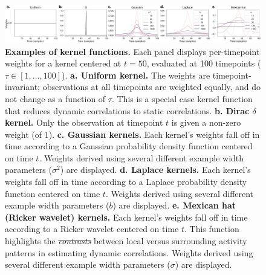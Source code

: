 \documentclass[english]{article}
\providecommand{\DIFaddtex}[1]{{\protect\color{blue}\uwave{#1}}} %
\providecommand{\DIFdeltex}[1]{{\protect\color{red}\sout{#1}}}                      %
\providecommand{\DIFaddFL}[1]{\DIFadd{#1}} %
\providecommand{\DIFdelFL}[1]{\DIFdel{#1}} %
\providecommand{\DIFaddbeginFL}{} %
\providecommand{\DIFaddendFL}{} %
\providecommand{\DIFdelbeginFL}{} %
\providecommand{\DIFdelendFL}{} %
\providecommand{\DIFadd}[1]{\texorpdfstring{\DIFaddtex{#1}}{#1}} %
\providecommand{\DIFdel}[1]{\texorpdfstring{\DIFdeltex{#1}}{}} %
\newcommand{\DIFscaledelfig}{0.5}
\newlength{\DIFdelgraphicswidth} %
\newlength{\DIFdelgraphicsheight} %
\newcommand{\DIFaddincludegraphics}[2][]{{\color{blue}\fbox{\DIFOincludegraphics[#1]{#2}}}} %
\newcommand{\DIFdelincludegraphics}[2][]{%
\sbox{\DIFdelgraphicsbox}{\DIFOincludegraphics[#1]{#2}}%
\settoboxwidth{\DIFdelgraphicswidth}{\DIFdelgraphicsbox} %
\settoboxtotalheight{\DIFdelgraphicsheight}{\DIFdelgraphicsbox} %
\scalebox{\DIFscaledelfig}{%
\parbox[b]{\DIFdelgraphicswidth}{\usebox{\DIFdelgraphicsbox}\\[-\baselineskip] \rule{\DIFdelgraphicswidth}{0em}}\llap{\resizebox{\DIFdelgraphicswidth}{\DIFdelgraphicsheight}{%
\setlength{\unitlength}{\DIFdelgraphicswidth}%
\begin{picture}(1,1)%
\thicklines\linethickness{2pt} %
{\color[rgb]{1,0,0}\put(0,0){\framebox(1,1){}}}%
{\color[rgb]{1,0,0}\put(0,0){\line( 1,1){1}}}%
{\color[rgb]{1,0,0}\put(0,1){\line(1,-1){1}}}%
\end{picture}%
}\hspace*{3pt}}} %
} %
\DeclareRobustCommand{\DIFaddbeginFL}{\DIFOaddbeginFL \let\includegraphics\DIFaddincludegraphics} %
\DeclareRobustCommand{\DIFaddendFL}{\DIFOaddendFL \let\includegraphics\DIFOincludegraphics} %
\DeclareRobustCommand{\DIFdelbeginFL}{\DIFOdelbeginFL \let\includegraphics\DIFdelincludegraphics} %
\DeclareRobustCommand{\DIFdelendFL}{\DIFOaddendFL \let\includegraphics\DIFOincludegraphics} %
\begin{document}
\begin{figure}
  \centering
  \includegraphics[width=\textwidth]{figs/kernels}
  \caption{\textbf{Examples of kernel functions.} Each panel displays
    per-timepoint weights for a kernel centered at $t = 50$, evaluated
    at 100 timepoints ($\tau \in \left[1, ..., 100\right]$).
   \textbf{a. Uniform kernel.} The weights are timepoint-invariant;
    observations at all timepoints are weighted equally, and do not
    change as a function of $\tau$.  This is a special case kernel
    function that reduces dynamic correlations to static correlations.
   \textbf{b. Dirac $\delta$ kernel.} Only the observation at
    timepoint $t$ is given a non-zero weight (of 1).
   \textbf{c. Gaussian kernels.} Each kernel's weights fall off in
    time according to a Gaussian probability density function centered
    on time $t$.  Weights derived using several different example
    width parameters ($\sigma^2$) are displayed.  \textbf{d. Laplace
       kernels.}  Each kernel's weights fall off in time according to a
    Laplace probability density function centered on time $t$.
    Weights derived using several different example width parameters
    ($b$) are displayed.  \textbf{e. Mexican hat (Ricker wavelet)
       kernels.}  Each kernel's weights fall off in time according to a
    Ricker wavelet centered on time $t$.  This function highlights the
    \DIFdelbeginFL \textit{\DIFdelFL{contrasts}} %
\DIFdelendFL \DIFaddbeginFL \DIFaddFL{contrasts }\DIFaddendFL between local versus surrounding activity
    patterns in estimating dynamic correlations. Weights derived using
    several different example width parameters ($\sigma$) are
    displayed.}
  \label{fig:kernels}

\end{figure}
\end{document}
